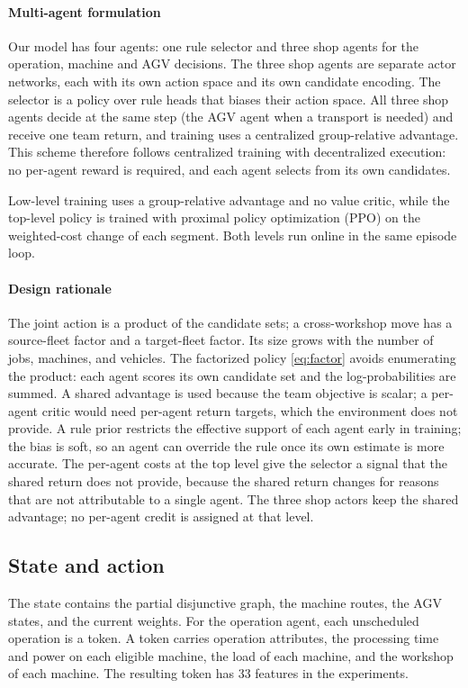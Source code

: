 \paragraph{Multi-agent formulation}
Our model has four agents: one rule selector and three shop agents for the
operation, machine and AGV decisions. The three shop agents are separate
actor networks, each with its own action space and its own candidate encoding.
The selector is a policy over rule heads that biases their action space. All
three shop agents
decide at the same step (the AGV agent when a transport is needed) and receive
one team return, and training uses a centralized group-relative advantage. This
scheme therefore follows centralized training with decentralized execution: no
per-agent reward is required, and each agent selects from its own candidates.

Low-level training uses a group-relative advantage and no value critic, while the top-level policy is trained with proximal
policy optimization (PPO) on the weighted-cost change of each segment. Both
levels run online in the same episode loop.

\paragraph{Design rationale}
The joint action is a product of the candidate sets; a cross-workshop move has
a source-fleet factor and a target-fleet factor. Its size grows
with the number of jobs, machines, and vehicles. The factorized policy
\eqref{eq:factor} avoids enumerating the product: each agent scores its own
candidate set and the log-probabilities are summed. A shared advantage is
used because the team objective is scalar; a per-agent critic would need
per-agent return targets, which the environment does not provide. A rule
prior restricts the effective support of each agent early in training; the
bias is soft, so an agent can override the rule once its own estimate is more
accurate. The per-agent costs at the top level give the selector a signal that
the shared return does not provide, because the shared return changes for
reasons that are not attributable to a single agent. The three shop actors
keep the shared advantage; no per-agent credit is assigned at that level.

\subsection{State and action}

The state contains the partial disjunctive graph, the machine routes, the AGV
states, and the current weights. For the operation agent, each unscheduled
operation is a token. A token carries operation attributes, the processing
time and power on each eligible machine, the load of each machine, and the
workshop of each machine. The resulting token has 33 features in the
experiments.

